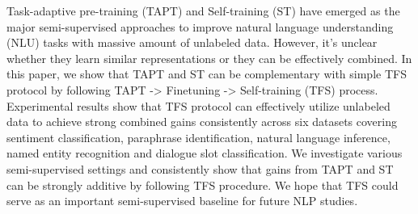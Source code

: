 Task-adaptive pre-training (TAPT) and Self-training (ST) have emerged as the major semi-supervised approaches to improve natural language understanding (NLU) tasks with massive amount of unlabeled data. However, it's unclear whether they learn similar representations or they can be effectively combined. In this paper, we show that TAPT and ST can be complementary with simple TFS protocol by following TAPT -> Finetuning  -> Self-training (TFS) process. Experimental results show that TFS protocol can effectively utilize unlabeled data to achieve strong combined gains consistently across six datasets covering sentiment classification, paraphrase identification, natural language inference, named entity recognition and dialogue slot classification. We investigate various semi-supervised settings and consistently show that gains from TAPT and ST can be strongly additive by following TFS procedure. We hope that TFS could serve as an important semi-supervised baseline for future NLP studies.
